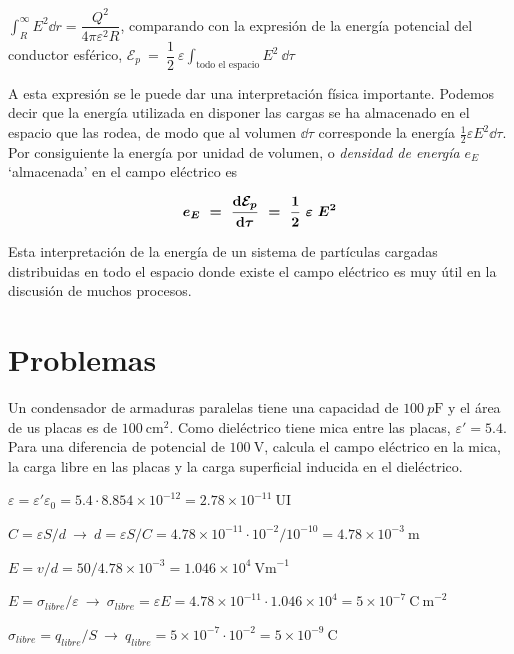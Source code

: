$\displaystyle \int_R^\infty E^2 \dd r=\dfrac {Q^2}{4\pi \varepsilon^2 R}$, comparando con la expresión de la energía potencial del conductor esférico,
$\displaystyle \mathcal E_p \ = \ \dfrac 1 2 \ \varepsilon \int_{\text{todo el espacio}} E^2 \ \dd \tau$

A esta expresión se le puede dar una interpretación física importante. Podemos decir que la energía utilizada en disponer las cargas se ha almacenado en el espacio que las rodea, de modo que al volumen $\dd \tau$ corresponde la energía $\frac 1 2 \varepsilon E^2 \dd \tau$. Por consiguiente la energía por unidad de volumen, o \emph{densidad de energía} $e_E$ `almacenada' en el campo eléctrico es

\begin{equation}
\boldsymbol{ e_E\ = \ \displaystyle \dv{\mathcal E_p}{\tau}\ = \ \dfrac 1 2 \ \varepsilon \ E^2  } 	
\end{equation}

Esta interpretación de la energía de un sistema de partículas cargadas distribuidas en todo el espacio donde existe el campo eléctrico es muy útil en la discusión de muchos procesos.

\section{Problemas}

\begin{prob}
Un condensador de armaduras paralelas tiene una capacidad de $100\ p \mathrm{F}$	y el área de us placas es de $100\ \mathrm{cm}^2$. Como dieléctrico tiene mica entre las placas, $\varepsilon'=5.4$. Para una diferencia de potencial de $100\ \mathrm{V}$, calcula el campo eléctrico en la mica, la carga libre en las placas y la carga superficial inducida en el dieléctrico.
\end{prob}

$\varepsilon=\varepsilon' \varepsilon_0=5.4 \cdot 8.854 \times 10^{-12}=2.78\times 10^{-11}  \ \mathrm{UI}$

$C=\varepsilon S/d \ \to \ d=\varepsilon S/C= 4.78\times 10^{-11} \cdot 10^{-2} / 10^{-10} = 4.78\times 10^{-3} \ \mathrm{m}$

$E=v/d=50/4.78\times 10^{-3}=1.046\times 10^4\ \mathrm{V m}^{-1}$

$E=\sigma_{libre}/\varepsilon \ \to \ \sigma_{libre}=\varepsilon E= 4.78\times 10^{-11} \cdot 1.046\times 10^4=5\times 10^{-7} \ \mathrm{C\ m}^{-2}$

$\sigma_{libre}=q_{libre}/S \ \to \ q_{libre}=5\times 10^{-7} \cdot 10^{-2}=5\times 10^{-9}\ \mathrm{C}$


